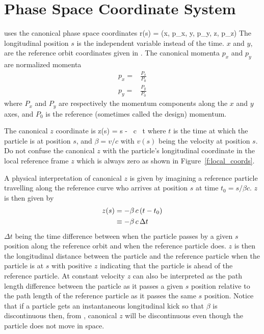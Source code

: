 \vfill

\section{Phase Space Coordinate System}
\label{s:phase_space_coords}

\bmad uses the canonical phase space coordinates 
\Begineq
  \Bf r(s) = (x, p_x, y, p_y, z, p_z)
\Endeq
The longitudinal position $s$ is the independent variable instead of
the time.  $x$ and $y$, are the reference orbit coordinates given in
.  The canonical momenta $p_x$ and $p_y$ are
normalized momenta
\begin{align}
  p_x = &\frac{P_x}{P_0} \\
  p_y = &\frac{P_y}{P_0}
\end{align}
where $P_x$ and $P_y$ are respectively the momentum components along
the $x$ and $y$ axes, and $P_0$ is the reference (sometimes called the
design) momentum.

The canonical $z$ coordinate is 
\Begineq
  z(s) = s - \beta \, c \, t 
  \label{zsbct}
\Endeq
where $t$ is the time at which the particle is at
position $s$, and $\beta = v/c$ with $v(s)$ being the velocity at position $s$. 
Do not confuse the canonical $z$ with the particle's longitudinal coordinate
in the local reference frame $z$ which is always zero as shown in
Figure~\ref{f:local_coords}.

A physical interpretation of canonical $z$ is given by
imagining a reference particle travelling along the reference curve who arrives
at position $s$ at time $t_0 = s / \beta c$. $z$ is then given by
\begin{align}
  z(s) &= -\beta \, c \, (t - t_0) \nonumber \\
    &\equiv - \beta \, c \, \Delta t
\end{align}
$\Delta t$ being the time difference between when the
particle passes by a given $s$ position along the reference orbit and
when the reference particle does. $z$ is then the longitudinal distance
between the particle and the reference particle when the particle is at $s$
with positive $z$ indicating that the particle is ahead of the reference 
particle. At constant velocity $z$ can also be interpreted as the 
path length difference between the
particle as it passes a given $s$ position relative to the
path length of the reference particle as it passes the same $s$
position. Notice that if a particle gets an instantaneous longitudinal kick
so that $\beta$ is discontinuous then, from ,
canonical $z$ will be discontinuous
even though the particle does not move in space.

